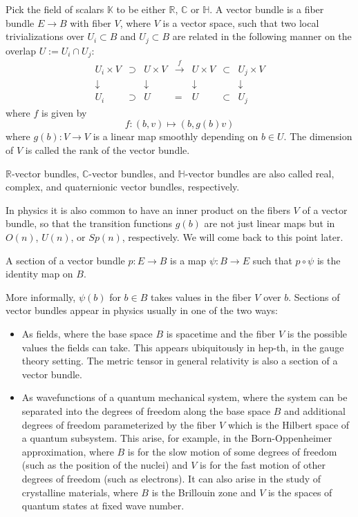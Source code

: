 \documentclass[12pt]{article}
\numberwithin{equation}{section}
\def\bC{\mathbb{C}}
\def\bH{\mathbb{H}}
\def\bK{\mathbb{K}}
\def\bR{\mathbb{R}}
\begin{document}
\begin{definition}
  Pick the field of scalars $\bK$ to be either $\bR$, $\bC$ or $\bH$.
  A vector bundle is a fiber bundle $E\to B$ with fiber $V$,
  where $V$ is a vector space, such that two local trivializations over $U_i \subset B$
  and $U_j\subset B$ are related in the following manner on the overlap $U:=U_i\cap U_j$:
  \begin{equation}
  \begin{array}{cccccccc}
    U_i \times V &\supset& U \times V & \xrightarrow{f } & 
    U \times V & \subset & U_j\times V \\
    \downarrow & & \downarrow & & \downarrow & & \downarrow \\
    U_i & \supset & U  & = & U  & \subset & U_j
  \end{array}
  \end{equation}
  where $f $ is given by \begin{equation}
    f : (b,v) \mapsto (b, g (b) v)
    \label{eq:vec-bundle-transition-functions}
  \end{equation} where $g (b): V\to V$ is a linear map smoothly depending on $b\in U$.
  The dimension of $V$ is called the rank of the vector bundle.
\end{definition}
$\bR$-vector bundles, $\bC$-vector bundles, and $\bH$-vector bundles
are also called real, complex, and quaternionic vector bundles, respectively.

In physics it is also common to have an inner product on the fibers $V$ of a vector bundle,
so that the transition functions $g (b)$ are not just linear maps
but in $O(n)$, $U(n)$, or $Sp(n)$, respectively.
We will come back to this point later.


\begin{definition}
  A section of a vector bundle $p:E\to B$ is a map $\psi: B\to E$ such that $p\circ \psi $ is the identity map on $B$.
\end{definition}
More informally, $\psi(b)$ for $b\in B$ takes values in the fiber $V$ over $b$.
Sections of vector bundles appear in physics usually in one of the two ways:
\begin{itemize}
  \item As fields, where the base space $B$ is spacetime and 
  the fiber $V$ is the possible values the fields can take.
  This appears ubiquitously in hep-th, in the gauge theory setting.
  The metric tensor in general relativity is also a section of a vector bundle.
  \item As wavefunctions of a quantum mechanical system, 
  where the system can be separated 
  into the degrees of freedom along the base space $B$
  and additional degrees of freedom parameterized by the fiber $V$ 
  which is the Hilbert space of a quantum subsystem.
  This arise, for example, in the Born-Oppenheimer approximation,
  where $B$ is for the slow motion of some degrees of freedom (such as the position of the nuclei) and 
  $V$ is for the fast motion of other degrees of freedom (such as electrons).
  It can also arise in the study of crystalline materials,
  where $B$ is the Brillouin zone and $V$ is the spaces of quantum states at fixed wave number.
\end{itemize}
\end{document}
